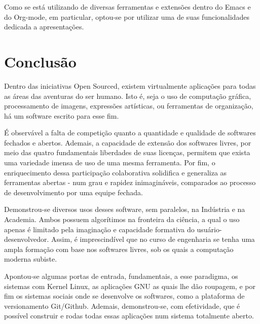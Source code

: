 \documentclass[
12pt,				%
openright,			%
oneside,			%
a4paper,			%
english,			%
french,				%
spanish,			%
brazil,				%
]{abntex2}
\begin{document}
Como se está utilizando de diversas ferramentas e extensões dentro do
Emacs e do Org-mode, em particular, optou-se por utilizar uma de suas
funcionalidades dedicada a apresentações. 

\chapter{Conclusão}

Dentro das iniciativas Open Sourced, existem virtualmente aplicações
para todas as áreas das aventuras do ser humano. Isto é, seja o uso de
computação gráfica, processamento de imagens, expressões artísticas,
ou ferramentas de organização, há um software escrito para esse fim.

É observável a falta de competição quanto a quantidade e qualidade de
softwares fechados e abertos. Ademais, a capacidade de
extensão dos softwares livres, por meio das quatro fundamentais
liberdades de suas licenças, permitem que exista uma variedade imensa
de uso de uma mesma ferramenta. Por fim, o enriquecimento dessa
participação colaborativa solidifica e generaliza as ferramentas
abertas - num grau e rapidez inimagináveis, comparados ao processo de
desenvolvimento por uma equipe fechada.

Demonstrou-se diversos usos desses software, sem paralelos, na
Indústria e na Academia. Ambos possuem algorítimos na fronteira da
ciência, a qual o uso apenas é limitado pela imaginação e capacidade
formativa do usuário-desenvolvedor. Assim, é imprescindível que no
curso de engenharia se tenha uma ampla formação com base nos softwares
livres, sob os quais a computação moderna subiste.

Apontou-se algumas portas de entrada, fundamentais, a esse paradigma,
os sistemas com Kernel Linux, as aplicações GNU as quais lhe dão
roupagem, e por fim os sistemas sociais onde se desenvolve os
softwares, como a plataforma de versionamento Git/Github. Ademais,
demonstrou-se, com efetividade, que é possível construir e rodas todas
essas aplicações num sistema totalmente aberto.


\end{document}
